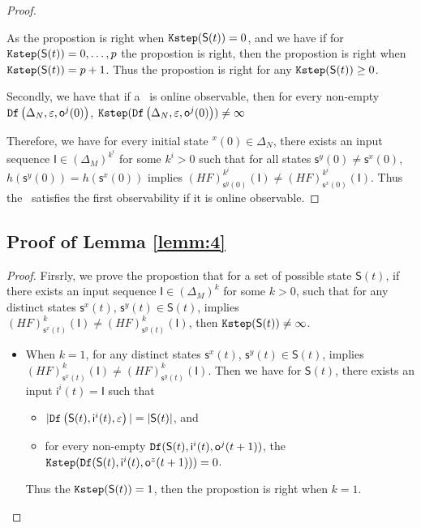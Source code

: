 \begin{appendices}
\begin{proof}
\begin{itemize}
\end{itemize}
As the propostion is right when ${\tt Kstep}(\mathsf{S}(t))=0$, and we have if for ${\tt Kstep}(\mathsf{S}(t))=0,\ldots, p$ the propostion is right, then the propostion is right when ${\tt Kstep}(\mathsf{S}(t))=p+1$. Thus the propostion is right for any ${\tt Kstep}(\mathsf{S}(t))\ge0$.

Secondly, we have that if a \BCN\ is online observable,
then for every  non-empty ${\tt Df}\left(\Delta_N,\varepsilon, \mathsf{o}^{j}(0)\right)$, ${\tt Kstep}({\tt Df}\left(\Delta_N,\varepsilon, \mathsf{o}^{j}(0)\right))\ne \infty$

Therefore, we have for every initial state \State$^{x}(0)$$\in \Delta_N$, there exists an input sequence $\mathsf{I}\in(\Delta_M)^{k^i}$ for some $k^i >0$ such that for all states $\mathsf{s}^{y}(0)\neq \mathsf{s}^{x}(0)$, $h(\mathsf{s}^{y}(0))=h(\mathsf{s}^{x}(0))$ implies $(HF)^{k^i}_{\mathsf{s}^{y}(0)}(\mathsf{I})\neq (HF)^{k^i}_{{\mathsf{s}^{x}(0)}}(\mathsf{I})$. Thus the \BCN\ satisfies the first observability if it is online observable.
\end{proof}

\subsection{Proof of Lemma \ref{lemm:4}}

\begin{proof}
Firsrly, we prove the propostion that for a set of possible state $\mathsf{S}(t)$, if there exists an input sequence $\mathsf{I}\in(\Delta_M)^{k}$ for some $k >0$, such that for any distinct states $\mathsf{s}^{x}(t)$, $\mathsf{s}^{y}(t) \in \mathsf{S}(t)$, implies $(HF)^{k}_{\mathsf{s}^{x}(t)}(\mathsf{I})\neq (HF)^{k}_{\mathsf{s}^{y}(t)}(\mathsf{I})$, then ${\tt Kstep}(\mathsf{S}(t))\ne\infty$.

\begin{itemize}
\item When $k=1$, for any distinct states $\mathsf{s}^{x}(t)$, $\mathsf{s}^{y}(t) \in \mathsf{S}(t)$, implies $(HF)^{k}_{\mathsf{s}^{x}(t)}(\mathsf{I})\neq (HF)^{k}_{\mathsf{s}^{y}(t)}(\mathsf{I})$. Then we have for $\mathsf{S}(t)$,
 there exists an input $\mathsf{i}^{i}(t)=\mathsf{I}$ such that
 \begin{itemize}
 \item  $|{\tt Df}\left(\mathsf{S}(t),\mathsf{i}^{i}(t),\varepsilon\right)|=|\mathsf{S}(t)|$, and 
 \item  for every non-empty ${\tt Df}(\mathsf{S}(t),\mathsf{i}^{i}(t),\mathsf{o}^{j}(t+1))$, the ${\tt Kstep}({\tt Df}(\mathsf{S}(t),\mathsf{i}^{i}(t),\mathsf{o}^{z}(t+1)))=0$.
 \end{itemize}
Thus the ${\tt Kstep}(\mathsf{S}(t))=1$, then the propostion is right when $k =1$.


\end{itemize}
\end{proof}
\end{appendices}
